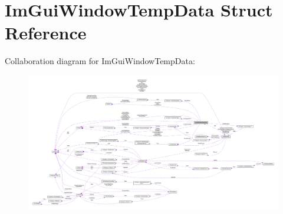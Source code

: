 \hypertarget{structImGuiWindowTempData}{}\section{Im\+Gui\+Window\+Temp\+Data Struct Reference}
\label{structImGuiWindowTempData}


Collaboration diagram for Im\+Gui\+Window\+Temp\+Data\+:\nopagebreak
\begin{figure}[H]
\begin{center}
\leavevmode
\includegraphics[width=350pt]{structImGuiWindowTempData__coll__graph}
\end{center}
\end{figure}
